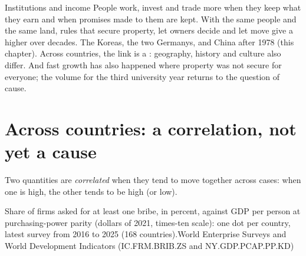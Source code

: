\begin{model}{Institutions and income}
\assumes People work, invest and trade more when they keep what they earn and when promises made to them
are kept.
\predicts With the same people and the same land, rules that secure property, let owners decide and let
 move give a higher  over decades.
\tested The Koreas, the two Germanys, and China after 1978 (this chapter).
\breaks Across countries, the link is a : geography, history and culture also differ. And fast
growth has also happened where property was not secure for everyone; the volume for the third university
year returns to the question of cause.
\end{model}

\section{Across countries: a correlation, not yet a cause}

\begin{definition}[Correlation]\label{def:g9:institutions-and-prosperity:correlation}
Two quantities are \emph{correlated} when they tend to move together across cases: when
one is high, the other tends to be high (or low).
\end{definition}

\begin{omchart}{Share of firms asked for at least one bribe, in percent, against GDP per person at
purchasing-power parity (dollars of 2021, times-ten scale): one dot per country, latest survey from 2016 to
2025 (168 countries).}{World  Enterprise Surveys and World Development Indicators (IC.FRM.BRIB.ZS and
NY.GDP.PCAP.PP.KD)}
\end{omchart}

